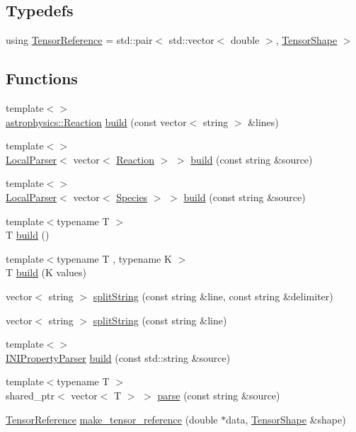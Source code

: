 \subsection*{Typedefs}
\begin{DoxyCompactItemize}
\item 
using \hyperlink{a00103_a744d7805ef98562de55f32012ab11cfb}{Tensor\+Reference} = std\+::pair$<$ std\+::vector$<$ double $>$, \hyperlink{a00048}{Tensor\+Shape} $>$
\end{DoxyCompactItemize}
\subsection*{Functions}
\begin{DoxyCompactItemize}
\item 
{\footnotesize template$<$$>$ }\\\hyperlink{a00033}{astrophysics\+::\+Reaction} \hyperlink{a00103_abca66b4f2a1543308b663714bd8b4855}{build} (const vector$<$ string $>$ \&lines)
\item 
{\footnotesize template$<$$>$ }\\\hyperlink{a00029}{Local\+Parser}$<$ vector$<$ \hyperlink{a00033}{Reaction} $>$ $>$ \hyperlink{a00103_aaf82cc265522a41ebc36e8405e0c7559}{build} (const string \&source)
\item 
{\footnotesize template$<$$>$ }\\\hyperlink{a00029}{Local\+Parser}$<$ vector$<$ \hyperlink{a00039}{Species} $>$ $>$ \hyperlink{a00103_a138f22945f7a7ec642432fd24a94b414}{build} (const string \&source)
\item 
{\footnotesize template$<$typename T $>$ }\\T \hyperlink{a00103_a5c0e80ce60cddb0a4ac83333b41fded1}{build} ()
\item 
{\footnotesize template$<$typename T , typename K $>$ }\\T \hyperlink{a00103_a45fa78347513e865dc6c767cff0b4ef1}{build} (K values)
\item 
vector$<$ string $>$ \hyperlink{a00103_af9246260a2324ca34737fc15210e5231}{split\+String} (const string \&line, const string \&delimiter)
\item 
vector$<$ string $>$ \hyperlink{a00103_a93688d46b0b3eb4b91a913d0151696c0}{split\+String} (const string \&line)
\item 
{\footnotesize template$<$$>$ }\\\hyperlink{a00020}{I\+N\+I\+Property\+Parser} \hyperlink{a00103_a624f274bd6de1d7b829c9883ac3397cd}{build} (const std\+::string \&source)
\item 
{\footnotesize template$<$typename T $>$ }\\shared\+\_\+ptr$<$ vector$<$ T $>$ $>$ \hyperlink{a00103_a2b47cfd8a5d8711cdc55e1397487b90b}{parse} (const string \&source)
\item 
\hyperlink{a00103_a744d7805ef98562de55f32012ab11cfb}{Tensor\+Reference} \hyperlink{a00103_a6dee95c23e122d0f744cde59dbdb1a4c}{make\+\_\+tensor\+\_\+reference} (double $\ast$data, \hyperlink{a00048}{Tensor\+Shape} \&shape)
\end{DoxyCompactItemize}


